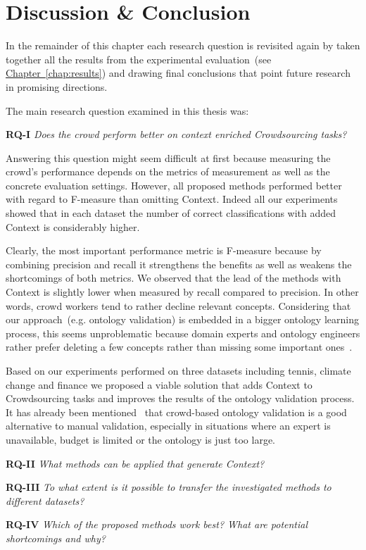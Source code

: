 \chapter{Discussion \& Conclusion}\label{chap:discussion_and_conclusion}

In the remainder of this chapter each research question is revisited again by taken together all the results from the experimental evaluation~(see \hyperref[chap:results]{Chapter~\ref*{chap:results}}) and drawing final conclusions that point future research in promising directions. 

The main research question examined in this thesis was:
 
\textbf{RQ-I} \emph{Does the crowd perform better on context enriched Crowdsourcing tasks?}

Answering this question might seem difficult at first because measuring the crowd's performance depends on the metrics of measurement as well as the concrete evaluation settings. However, all proposed methods performed better with regard to F-measure than omitting Context. Indeed all our experiments showed that in each dataset the number of correct classifications with added Context is considerably higher. 

Clearly, the most important performance metric is F-measure because by combining precision and recall it strengthens the benefits as well as weakens the shortcomings of both metrics. We observed that the lead of the methods with Context is slightly lower when measured by recall compared to precision. In other words, crowd workers tend to rather decline relevant concepts. Considering that our approach~(e.g. ontology validation) is embedded in a bigger ontology learning process, this seems unproblematic because domain experts and ontology engineers rather prefer deleting a few concepts rather than missing some important ones~\cite{sabou2006}. 

Based on our experiments performed on three datasets including tennis, climate change and finance we proposed a viable solution that adds Context to Crowdsourcing tasks and improves the results of the ontology validation process. It has already been mentioned~\cite{mortensen2015, mortensen2016, wohlgenannt2016} that crowd-based ontology validation is a good alternative to manual validation, especially in situations where an expert is unavailable, budget is limited or the ontology is just too large. 

\textbf{RQ-II} \emph{What methods can be applied that generate Context?}



\textbf{RQ-III} \emph{To what extent is it possible to transfer the investigated methods to different datasets?}

\textbf{RQ-IV} \emph{Which of the proposed methods work best? What are potential shortcomings and why?} 

